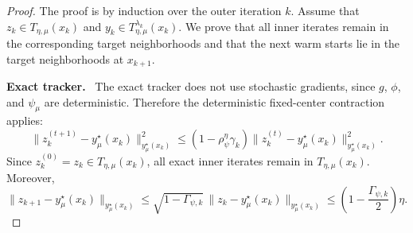 \documentclass{article}
\newcommand{\proofstep}[1]{\par\smallskip\noindent\textbf{#1}\ }
\begin{document}
\begin{proof}
The proof is by induction over the outer iteration \(k\). Assume that
\(z_k\in T_{\eta,\mu}(x_k)\) and
\(y_k\in T_{\eta,\mu}^{\lambda_k}(x_k)\). We prove that all inner iterates remain in the corresponding
target neighborhoods and that the next warm starts lie in the target neighborhoods at \(x_{k+1}\).

\proofstep{Exact tracker.}
The exact tracker does not use stochastic gradients, since \(g\), \(\phi\), and \(\psi_\mu\) are
deterministic. Therefore the deterministic fixed-center contraction applies:
\[
\|z_k^{(t+1)}-y_\mu^\star(x_k)\|_{y_\mu^\star(x_k)}^2
\le
(1-\rho_\psi^\eta\gamma_k)
\|z_k^{(t)}-y_\mu^\star(x_k)\|_{y_\mu^\star(x_k)}^2 .
\]
Since \(z_k^{(0)}=z_k\in T_{\eta,\mu}(x_k)\), all exact inner iterates remain in
\(T_{\eta,\mu}(x_k)\). Moreover,
\[
\|z_{k+1}-y_\mu^\star(x_k)\|_{y_\mu^\star(x_k)}
\le
\sqrt{1-\Gamma_{\psi,k}}\,
\|z_k-y_\mu^\star(x_k)\|_{y_\mu^\star(x_k)}
\le
\left(1-\frac{\Gamma_{\psi,k}}{2}\right)\eta .
\]


\end{proof}
\end{document}
